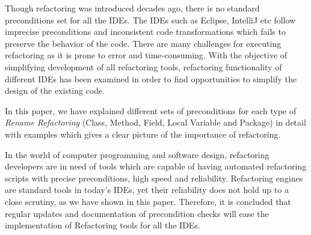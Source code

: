 \documentclass[10pt,conference]{IEEEtran}
\begin{document}
Though refactoring was introduced decades ago, there is no standard preconditions set for all the IDEs. The IDEs such as Eclipse, IntelliJ etc follow imprecise preconditions and inconsistent code transformations which fails to preserve the behavior of the code. There are many challenges for executing refactoring as it is prone to error and time-consuming. With the objective of simplifying development of all refactoring tools, refactoring functionality of different IDEs has been examined in order to find opportunities to simplify the design of the existing code. 

In this paper, we have explained different sets of preconditions for each type of \textit{Rename Refactoring} (Class, Method, Field, Local Variable and Package) in detail with examples which gives a clear picture of the importance of refactoring. 

In the world of computer programming and software design, refactoring developers are in need of tools which are capable of having automated refactoring scripts with precise preconditions, high speed and reliability. Refactoring engines are standard tools in today’s IDEs, yet their reliability does not hold up to a close scrutiny, as we have shown in this paper. Therefore, it is concluded that regular updates and documentation of precondition checks will ease the implementation of Refactoring tools for all the IDEs.



\end{document}
